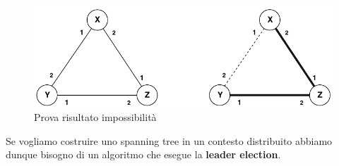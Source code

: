 \documentclass[12pt]{article}
\begin{document}
			\begin{figure}[h!]
				\centering
				\includegraphics[scale=0.35]{img/imposprove.png}
				\caption{Prova risultato impossibilità}
			\end{figure}
			Se vogliamo costruire uno spanning tree in un contesto distribuito abbiamo dunque bisogno di un algoritmo che esegue la \textbf{leader election}.
			
\end{document}
